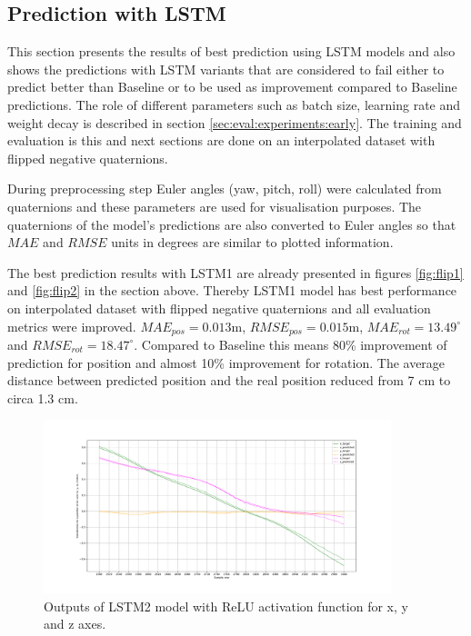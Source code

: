\subsection{Prediction with LSTM}
\label{sec:eval:experiments:lstm}
This section presents the results of best prediction using LSTM models and also shows the predictions with LSTM variants that are considered to fail either to predict better than Baseline or to be used as improvement compared to Baseline predictions. The role of different parameters such as batch size, learning rate and weight decay is described in section \ref{sec:eval:experiments:early}. The training and evaluation is this and next sections are done on an interpolated dataset with flipped negative quaternions. 

During preprocessing step Euler angles (yaw, pitch, roll) were calculated from quaternions and these parameters are used for visualisation purposes. The quaternions of the model's predictions are also converted to Euler angles so that $MAE$ and $RMSE$ units in degrees are similar to plotted information. 

The best prediction results with LSTM1 are already presented in figures \ref{fig:flip1} and \ref{fig:flip2} in the section above. Thereby LSTM1 model has best performance on interpolated dataset with flipped negative quaternions and all evaluation metrics were improved. $MAE_{pos} = 0.013$m, $RMSE_{pos} = 0.015$m, $MAE_{rot} = 13.49^{\circ}$ and $RMSE_{rot}  =18.47^{\circ}$. Compared to Baseline this means 80\% improvement of prediction for position and almost 10\% improvement for rotation. The average distance between predicted position and the real position reduced from 7 cm to circa 1.3 cm.
\begin{figure}[t]
	\begin{center}
		\includegraphics[width=0.9\textwidth, keepaspectratio]{gfx/lstm2_relu-xyz_position.pdf}
		\caption{\label{fig:lstm2-1} Outputs of LSTM2 model with ReLU activation function for x, y and z axes.}
	\end{center}
\end{figure}

